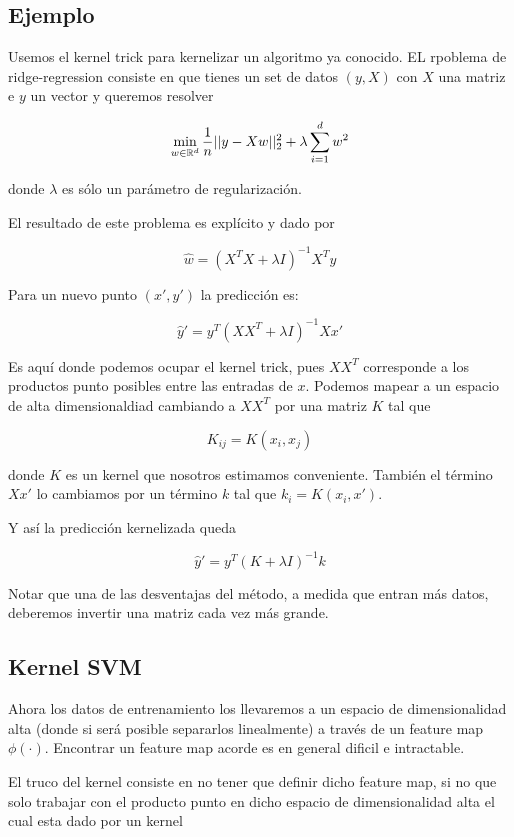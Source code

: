 \subsection{Ejemplo}

Usemos el kernel trick para kernelizar un algoritmo ya conocido. EL rpoblema de ridge-regression consiste en que tienes un set de datos $(y,X)$ con $X$ una matriz e $y$ un vector y queremos resolver

$$\min_{w \in {\mathbb R}^d} \frac{1}{n}||y - Xw||^{2}_{2} + \lambda \sum\limits_{i=1}^{d} w^2$$

donde $\lambda$ es sólo un parámetro de regularización.

El resultado de este problema es explícito y dado por

$$\hat{w} = (X^T X + \lambda I)^{-1} X^T y$$

Para un nuevo punto $(x', y')$ la predicción es: 

$$\hat{y}' = y^T (XX^T + \lambda I)^{-1} X x'$$


Es aquí donde podemos ocupar el kernel trick, pues $XX^T $ corresponde a los productos punto posibles entre las entradas de $x$. Podemos mapear a un espacio de alta dimensionaldiad cambiando a $XX^T$ por una matriz $K$ tal que

$$K_{ij} = K(x_i, x_j)$$

donde $K$ es un kernel que nosotros estimamos conveniente. También el término $X x' $ lo cambiamos por un término $k$ tal que $k_i = K(x_i , x')$.

Y así la predicción kernelizada queda

$$\hat{y}' = y^T (K + \lambda I)^{-1} k$$

Notar que una de las desventajas del método, a medida que entran más datos, deberemos invertir una matriz cada vez más grande. 

\subsection{Kernel SVM}



Ahora los datos de entrenamiento los llevaremos a un espacio de dimensionalidad alta (donde si será posible separarlos linealmente) a través de un feature map $\phi(\cdot)$. Encontrar un feature map acorde es en general dificil e intractable. 

El truco del kernel consiste en no tener que definir dicho feature map, si no que solo trabajar con el producto punto en dicho espacio de dimensionalidad alta el cual esta dado por un kernel 

